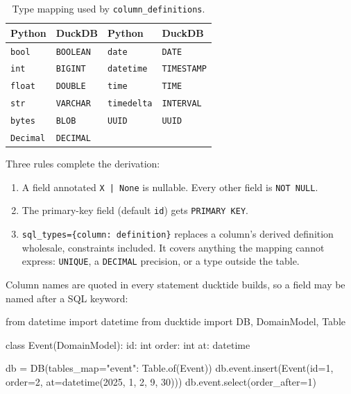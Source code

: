 \documentclass[11pt,a4paper]{article}
\newcommand{\code}[1]{\texttt{#1}}
\begin{document}
\begin{table}[h]
\centering\small
\begin{tabular}{@{}ll@{\qquad}ll@{}}
\toprule
Python & DuckDB & Python & DuckDB \\
\midrule
\code{bool}     & \code{BOOLEAN}   & \code{date}      & \code{DATE} \\
\code{int}      & \code{BIGINT}    & \code{datetime}  & \code{TIMESTAMP} \\
\code{float}    & \code{DOUBLE}    & \code{time}      & \code{TIME} \\
\code{str}      & \code{VARCHAR}   & \code{timedelta} & \code{INTERVAL} \\
\code{bytes}    & \code{BLOB}      & \code{UUID}      & \code{UUID} \\
\code{Decimal}  & \code{DECIMAL}   &                  & \\
\bottomrule
\end{tabular}
\caption{Type mapping used by \code{column\_definitions}.}
\label{tab:types}
\end{table}

Three rules complete the derivation:
\begin{enumerate}
  \item A field annotated \code{X | None} is nullable. Every other field is \code{NOT NULL}.
  \item The primary-key field (default \code{id}) gets \code{PRIMARY KEY}.
  \item \code{sql\_types=\{column: definition\}} replaces a column's derived definition
    wholesale, constraints included. It covers anything the mapping cannot express:
    \code{UNIQUE}, a \code{DECIMAL} precision, or a type outside the table.
\end{enumerate}

Column names are quoted in every statement ducktide builds, so a field may be named after
a SQL keyword:

\begin{python}
from datetime import datetime
from ducktide import DB, DomainModel, Table

class Event(DomainModel):
    id: int
    order: int
    at: datetime

db = DB(tables_map={"event": Table.of(Event)})
db.event.insert(Event(id=1, order=2, at=datetime(2025, 1, 2, 9, 30)))
db.event.select(order_after=1)
\end{python}
\begin{console}
[Event(id=1, order=2, at=datetime.datetime(2025, 1, 2, 9, 30))]
\end{console}
\end{document}
